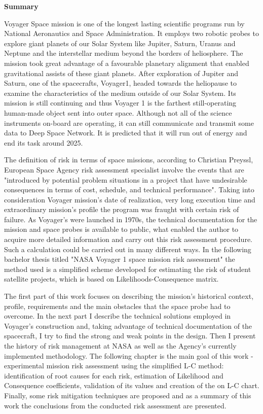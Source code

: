 \begin{center}
\textbf{Summary}
\end{center}

Voyager Space mission is one of the longest lasting scientific programs run by National Aeronautics and Space Administration. It employs two robotic probes to explore giant planets of our Solar System like Jupiter, Saturn, Uranus and Neptune and the interstellar medium beyond the borders of heliosphere. The mission took great advantage of a favourable planetary alignment that enabled gravitational assists of these giant planets. After exploration of Jupiter and Saturn, one of the spacecrafts, Voyager1, headed towards the heliopause to examine the characteristics of the medium outside of our Solar System. Its mission is still continuing and thus Voyager 1 is the farthest still-operating human-made object sent into outer space. Although not all of the science instruments on-board are operating, it can still communicate and transmit some data to Deep Space Network. It is predicted that it will run out of energy and end its task around 2025.

The definition of risk in terms of space missions, according to Christian Preyssl, European Space Agency risk assessment specialist involve the events that are "introduced by potential problem situations in a project that have undesirable consequences in terms of cost, schedule, and technical performance". Taking into consideration Voyager mission's date of realization, very long execution time and extraordinary mission's profile the program was fraught with certain risk of failure. As Voyager's were launched in 1970s, the technical documentation for the mission and space probes is available to public, what enabled the author to acquire more detailed information and carry out this risk assessment procedure. Such a calculation could be carried out in many different ways. In the following bachelor thesis titled "NASA Voyager 1 space mission risk assessment" the method used is a simplified scheme developed for estimating the risk of student satellite projects, which is based on Likelihoods-Consequence matrix.

The first part of this work focuses on describing the mission's historical context, profile, requirements and the main obstacles that the space probe had to overcome. In the next part I describe the technical solutions employed in Voyager's construction and, taking advantage of technical documentation of the spacecraft, I try to find the strong and weak points in the design. Then I present the history of risk management at NASA as well as the Agency's currently implemented methodology. The following chapter is the main goal of this work - experimental mission risk assessment using the simplified L-C method: identification of root causes for each risk, estimation of Likelihood and Consequence coefficients, validation of its values and creation of the on L-C chart. Finally, some risk mitigation techniques are proposed and as a summary of this work the conclusions from the conducted risk assessment are presented.

